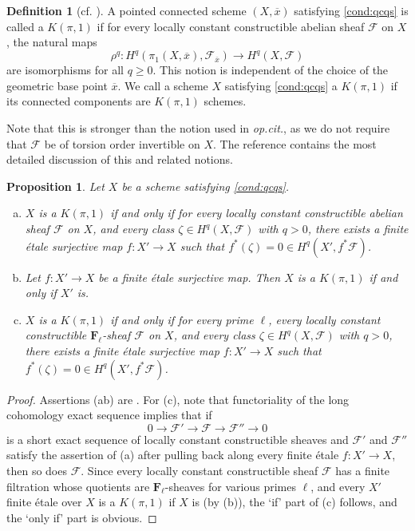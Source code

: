 \documentclass[twoside]{amsart}
\newcommand{\FF}{\mathbf{F}}
\newcommand{\Ff}{\mathscr{F}}
\renewcommand{\to}{\longrightarrow}
\renewcommand{\bar}{\overline}
\theoremstyle{plain}
\newtheorem{proposition}[subsubsection]{Proposition}
\theoremstyle{definition}
\newtheorem{definition}[subsubsection]{Definition}
\theoremstyle{remark}
\numberwithin{equation}{subsection}
\begin{document}
\begin{definition}[{cf. \cite[Definition~9.20]{Higgs2}}] \label{def:kpi1}
	A pointed connected scheme $(X, \bar x)$ satisfying \eqref{cond:qcqs} is called a $K(\pi, 1)$ if for every locally constant constructible abelian sheaf $\Ff$ on $X$, the natural maps
	\begin{equation} \label{eqn:rhomaps2}
		\rho^q \colon H^q(\pi_1(X, \bar x), \Ff_{\bar x})\to H^q(X, \Ff)   
	\end{equation}
	are isomorphisms for all $q\geq 0$. This notion is independent of the choice of the geometric base point $\bar x$. We call a scheme $X$ satisfying \eqref{cond:qcqs} a $K(\pi, 1)$ if its connected components are $K(\pi, 1)$ schemes.
\end{definition}

Note that this is stronger than the notion used in \emph{op.cit.}, as we do not require that $\Ff$ be of torsion order invertible on $X$. The reference \cite[\S 9]{Higgs2} contains the most detailed discussion of this and related notions.

\begin{proposition} \label{kpi1prop} 
	Let $X$ be a scheme satisfying \eqref{cond:qcqs}. 
	\begin{enumerate}[(a)]
		\item $X$ is a $K(\pi, 1)$ if and only if for every locally constant constructible abelian sheaf $\Ff$ on $X$, and every class $\zeta\in H^q(X, \Ff)$ with $q>0$, there exists a finite \'etale surjective map $f\colon X'\to X$ such that $f^*(\zeta) = 0 \in H^q(X', f^* \Ff)$.
		\item Let $f\colon X'\to X$ be a finite \'etale surjective map. Then $X$ is a $K(\pi, 1)$ if and only if $X'$ is.
		\item $X$ is a $K(\pi, 1)$ if and only if for every prime $\ell$, every locally constant constructible $\FF_\ell$-sheaf $\Ff$ on $X$, and every class $\zeta\in H^q(X, \Ff)$ with $q>0$, there exists a finite \'etale surjective map $f\colon X'\to X$ such that $f^*(\zeta) = 0 \in H^q(X', f^* \Ff)$.
	\end{enumerate}
\end{proposition}

\begin{proof}
Assertions (ab) are \cite[Proposition 3.2(ab)]{Achinger}. For (c), note that functoriality of the long cohomology exact sequence implies that if
\[ 
	0\to \Ff' \to \Ff\to \Ff''\to 0
\]
is a short exact sequence of locally constant constructible sheaves and $\Ff'$ and $\Ff''$ satisfy the assertion of (a) after pulling back along every finite \'etale $f\colon X'\to X$, then so does $\Ff$. Since every locally constant constructible sheaf $\Ff$ has a finite filtration whose quotients are $\FF_\ell$-sheaves for various primes $\ell$, and every $X'$ finite \'etale over $X$ is a $K(\pi, 1)$ if $X$ is (by (b)), the `if' part of (c) follows, and the `only if' part is obvious.
\end{proof}
\end{document}
